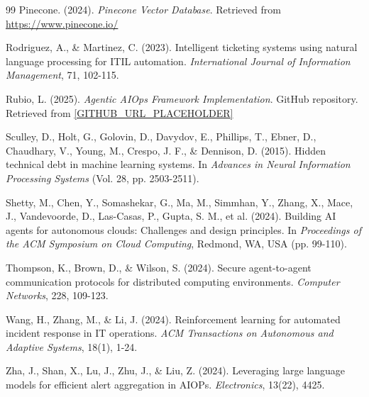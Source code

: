 \documentclass{article}
\begin{document}
\begin{thebibliography}{99}
Pinecone. (2024). \textit{Pinecone Vector Database}. Retrieved from \url{https://www.pinecone.io/}

Rodriguez, A., \& Martinez, C. (2023). Intelligent ticketing systems using natural language processing for ITIL automation. \textit{International Journal of Information Management}, 71, 102-115.

Rubio, L. (2025). \textit{Agentic AIOps Framework Implementation}. GitHub repository. Retrieved from \url{[GITHUB_URL_PLACEHOLDER]}

Sculley, D., Holt, G., Golovin, D., Davydov, E., Phillips, T., Ebner, D., Chaudhary, V., Young, M., Crespo, J. F., \& Dennison, D. (2015). Hidden technical debt in machine learning systems. In \textit{Advances in Neural Information Processing Systems} (Vol. 28, pp. 2503-2511).

Shetty, M., Chen, Y., Somashekar, G., Ma, M., Simmhan, Y., Zhang, X., Mace, J., Vandevoorde, D., Las-Casas, P., Gupta, S. M., et al. (2024). Building AI agents for autonomous clouds: Challenges and design principles. In \textit{Proceedings of the ACM Symposium on Cloud Computing}, Redmond, WA, USA (pp. 99-110).

Thompson, K., Brown, D., \& Wilson, S. (2024). Secure agent-to-agent communication protocols for distributed computing environments. \textit{Computer Networks}, 228, 109-123.

Wang, H., Zhang, M., \& Li, J. (2024). Reinforcement learning for automated incident response in IT operations. \textit{ACM Transactions on Autonomous and Adaptive Systems}, 18(1), 1-24.

Zha, J., Shan, X., Lu, J., Zhu, J., \& Liu, Z. (2024). Leveraging large language models for efficient alert aggregation in AIOPs. \textit{Electronics}, 13(22), 4425.

\end{thebibliography}
\end{document}
